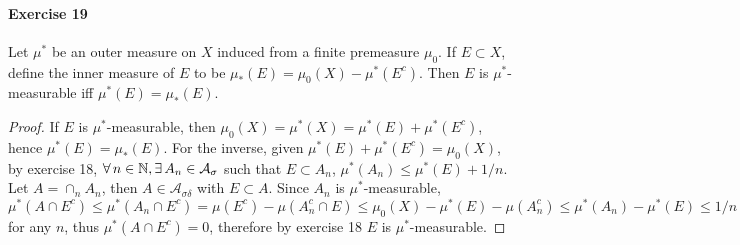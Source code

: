 \paragraph{Exercise 19}
Let $\mu^*$ be an outer measure on $X$ induced from a finite premeasure $\mu_0$. If $E\subset X$, define the inner measure of $E$ to be $\mu_*(E)=\mu_0(X)-\mu^*(E^c)$. Then $E$ is $\mu^*$-measurable iff $\mu^*(E)=\mu_*(E)$.
\begin{proof}
    If $E$ is $\mu^*$-measurable, then $\mu_0(X)=\mu^*(X)=\mu^*(E)+\mu^*(E^c)$, hence $\mu^*(E)=\mu_*(E)$. For the inverse, given $\mu^*(E)+\mu^*(E^c)=\mu_0(X)$, by exercise 18, $\forall\, n\in\mathbb{N}, \exists\, A_n\in\mathcal{A_\sigma}$ such that $E\subset A_n$, $\mu^*(A_n)\le\mu^*(E)+1/n$. Let $A=\cap_nA_n$, then $A\in\mathcal{A}_{\sigma\delta}$ with $E\subset A$. Since $A_n$ is $\mu^*$-measurable, $\mu^*(A\cap E^c)\le\mu^*(A_n\cap E^c)=\mu(E^c)-\mu(A_n^c\cap E)\le\mu_0(X)-\mu^*(E)-\mu(A_n^c)\le\mu^*(A_n)-\mu^*(E)\le1/n$ for any $n$, thus $\mu^*(A\cap E^c)=0$, therefore by exercise 18 $E$ is $\mu^*$-measurable.
\end{proof}
